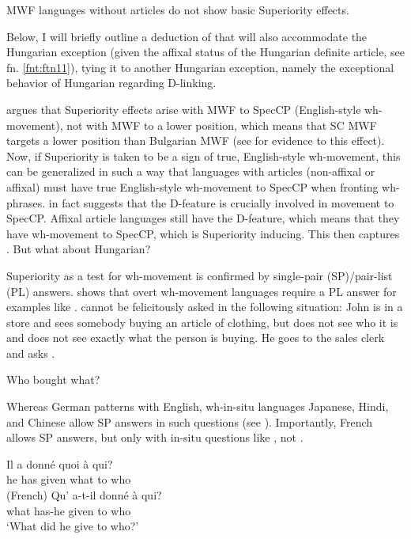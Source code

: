 \documentclass[output=paper,colorlinks,citecolor=brown]{langscibook}
\begin{document}
\ea\label{ex:bosk:29}
MWF languages without articles do not show basic Superiority effects.
\z 

\noindent Below, I will briefly outline a deduction of  that will also accommodate the Hungarian exception (given the affixal status of the Hungarian definite article, see fn. \ref{fnt:ftn11}), tying it to another Hungarian exception, namely the exceptional behavior of Hungarian regarding D-linking.

\citet{Bošković2002} argues that Superiority effects arise with MWF to SpecCP (English-style wh-movement), not with MWF to a lower position, which means that SC MWF targets a lower position than Bulgarian MWF (see \citealt{Bošković2002} for evidence to this effect). Now, if Superiority is taken to be a sign of true, English-style wh-movement, this can be generalized in such a way that languages with articles (non-affixal or affixal) must have true English-style wh-movement to SpecCP when fronting wh-phrases. \citet{Bošković2008} in fact suggests that the D-feature is crucially involved in movement to SpecCP. Affixal article languages still have the D-feature, which means that they have wh-movement to SpecCP, which is Superiority inducing. This then captures . But what about Hungarian? 

Superiority as a test for wh-movement is confirmed by single-pair (SP)/pair-list (PL) answers. \citet{Bošković2003,Bošković2002} shows that overt wh-movement languages require a PL answer for examples like .  cannot be felicitously asked in the following situation: John is in a store and sees somebody buying an article of clothing, but does not see who it is and does not see exactly what the person is buying. He goes to the sales clerk and asks .

 
\ea\label{ex:bosk:30}
Who bought what?
\z 

\noindent Whereas German patterns with English, wh-in-situ languages Japanese, Hindi, and Chinese allow SP answers in such questions (see \citealt{Bošković2003}). Importantly, French allows SP answers, but only with in-situ questions like , not .

 
\ea\label{ex:bosk:31}
\ea\label{ex:bosk:31a} 
\gll Il   a    donné quoi  à  qui?\\
he has given  what to who\\\hfill (French)
\ex\label{ex:bosk:31b} 
\gll Qu' a-t-il    donné à qui?\\
what has-he given   to who\\
\z 
`What did he give to who?'
\z 
\end{document}
